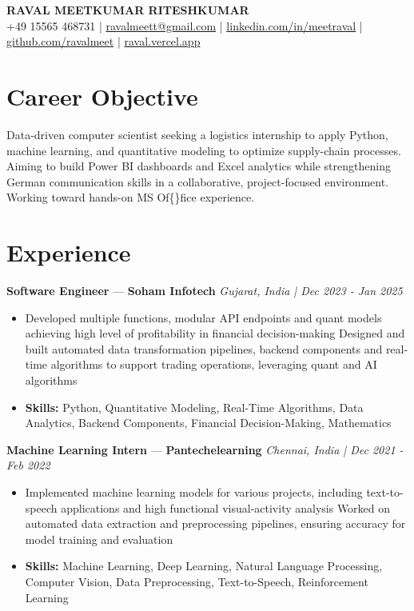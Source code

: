 \documentclass[a4paper,10pt]{article}
\begin{document}
\begin{center}
  {\Large\bfseries RAVAL MEETKUMAR RITESHKUMAR}\\[2pt]
  {\small +49 15565 468731 \;|\; \href{mailto:ravalmeett@gmail.com}{ravalmeett@gmail.com} \;|\; \href{https://www.linkedin.com/in/meetraval/}{linkedin.com/in/meetraval} \;|\; \href{https://github.com/ravalmeet}{github.com/ravalmeet} \;|\; \href{https://raval.vercel.app/}{raval.vercel.app}}
\end{center}
\vspace{-3pt}

\section*{Career Objective}
Data-driven computer scientist seeking a logistics internship to apply Python, machine learning, and quantitative modeling to optimize supply-chain processes. Aiming to build Power BI dashboards and Excel analytics while strengthening German communication skills in a collaborative, project-focused environment. Working toward hands-on MS Of\{\}fice experience.\par

\section*{Experience}
\textbf{Software Engineer} — \textbf{Soham Infotech} \hfill \textit{Gujarat, India \;|\; Dec 2023 - Jan 2025}\par
\vspace{1pt}
\begin{itemize}
  \item Developed multiple functions, modular API endpoints and quant models achieving high level of profitability in financial decision-making Designed and built automated data transformation pipelines, backend components and real-time algorithms to support trading operations, leveraging quant and AI algorithms
  \item \textbf{Skills:} Python, Quantitative Modeling, Real-Time Algorithms, Data Analytics, Backend Components, Financial Decision-Making, Mathematics
\end{itemize}
\vspace{3pt}
\textbf{Machine Learning Intern} — \textbf{Pantechelearning} \hfill \textit{Chennai, India \;|\; Dec 2021 - Feb 2022}\par
\vspace{1pt}
\begin{itemize}
  \item Implemented machine learning models for various projects, including text-to-speech applications and high functional visual-activity analysis Worked on automated data extraction and preprocessing pipelines, ensuring accuracy for model training and evaluation
  \item \textbf{Skills:} Machine Learning, Deep Learning, Natural Language Processing, Computer Vision, Data Preprocessing, Text-to-Speech, Reinforcement Learning
\end{itemize}
\end{document}

